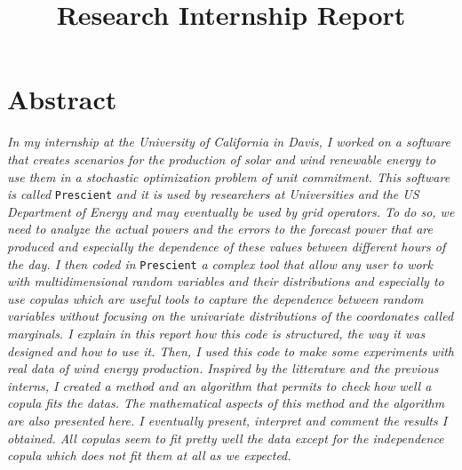 \documentclass{article}
\title{Research Internship Report}
\author{}
\date{}
\begin{document}

   
   \section*{Abstract}
   \textit{
   In my internship at the University of California in Davis, I worked on a software that creates scenarios for the production of solar and wind renewable energy to use them in a stochastic optimization problem of unit commitment. This software is called} \texttt{Prescient} \textit{and it is used by researchers at Universities and the US Department of Energy and may eventually be used by grid operators. To do so, we need to analyze the actual powers and the errors to the forecast power that are produced and especially the dependence of these values between different hours of the day. I then coded in} \texttt{Prescient} \textit{a complex tool that allow any user to work with multidimensional random variables and their distributions and especially to use copulas which are useful tools to capture the dependence between random variables without focusing on the univariate distributions of the coordonates called marginals. I explain in this report how this code is structured, the way it was designed and how to use it. Then, I used this code to make some experiments with real data of wind energy production. Inspired by the litterature and the previous interns, I created a method and an algorithm that permits to check how well a copula fits the datas. The mathematical aspects of this method and the algorithm are also presented here. I eventually present, interpret and comment the results I obtained. All copulas seem to fit pretty well the data except for the independence copula which does not fit them at all as we expected.}
\end{document}
